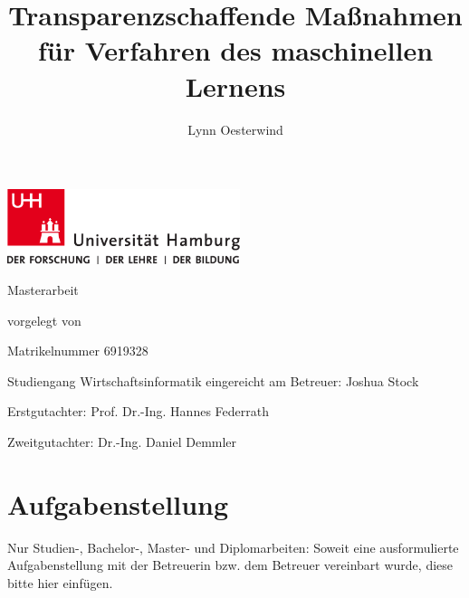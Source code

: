 \documentclass[
    fontsize=12pt,
    headings=small,
    twoside=false, %
    parskip=half,           %
    bibliography=totoc,
    numbers=noenddot,       %
    open=any,               %
    ]{scrreprt}
\title{Transparenzschaffende Maßnahmen für Verfahren des maschinellen Lernens}
\author{Lynn Oesterwind}
\begin{document}
\begin{titlepage}%
\includegraphics[width=6.8cm]{pic/up-uhh-logo-u-2010-u-farbe-u-rgb.pdf}
\begin{center}\Large
	\vfill
	Masterarbeit
	\vfill
	\makeatletter
	{\Large\textsf{\textbf{\@title}}\par}
	\makeatother
	\vfill
	vorgelegt von
	\par\bigskip
	\makeatletter
	{\@author} \par
	\makeatother
	Matrikelnummer 6919328 \par
	Studiengang Wirtschaftsinformatik
	\vfill
	\makeatletter
	eingereicht am {\@date}
	\makeatother
	\vfill
	Betreuer: Joshua Stock\par
	Erstgutachter: Prof. Dr.-Ing. Hannes Federrath \par
	Zweitgutachter: Dr.-Ing. Daniel Demmler
\end{center}
\end{titlepage}%


\tableofcontents
    
%


\chapter*{Aufgabenstellung}
Nur Studien-, Bachelor-, Master- und Diplomarbeiten: Soweit eine ausformulierte Aufgabenstellung mit der Betreuerin bzw. dem Betreuer vereinbart wurde, diese bitte hier einfügen.
\end{document}

